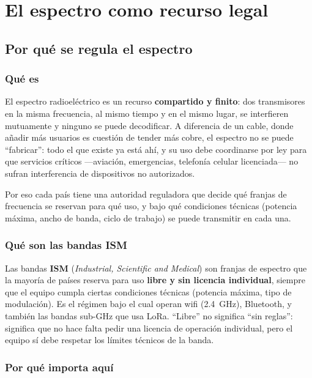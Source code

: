 \part{El espectro como recurso legal}
\label{part:regulacion}

\chapter{Por qué se regula el espectro}

\section{Qué es}

El espectro radioeléctrico es un recurso \textbf{compartido y finito}: dos transmisores en la
misma frecuencia, al mismo tiempo y en el mismo lugar, se interfieren mutuamente y ninguno se
puede decodificar. A diferencia de un cable, donde añadir más usuarios es cuestión de tender más
cobre, el espectro no se puede ``fabricar'': todo el que existe ya está ahí, y su uso debe
coordinarse por ley para que servicios críticos —aviación, emergencias, telefonía celular
licenciada— no sufran interferencia de dispositivos no autorizados.

Por eso cada país tiene una autoridad reguladora que decide qué franjas de frecuencia se
reservan para qué uso, y bajo qué condiciones técnicas (potencia máxima, ancho de banda, ciclo
de trabajo) se puede transmitir en cada una.

\section{Qué son las bandas ISM}

Las bandas \textbf{ISM} (\emph{Industrial, Scientific and Medical}) son franjas de espectro
que la mayoría de países reserva para uso \textbf{libre y sin licencia individual}, siempre que
el equipo cumpla ciertas condiciones técnicas (potencia máxima, tipo de modulación). Es el
régimen bajo el cual operan wifi (\SI{2.4}{GHz}), Bluetooth, y también las bandas sub-GHz que
usa LoRa. ``Libre'' no significa ``sin reglas'': significa que no hace falta pedir una licencia
de operación individual, pero el equipo sí debe respetar los límites técnicos de la banda.

\section{Por qué importa aquí}

